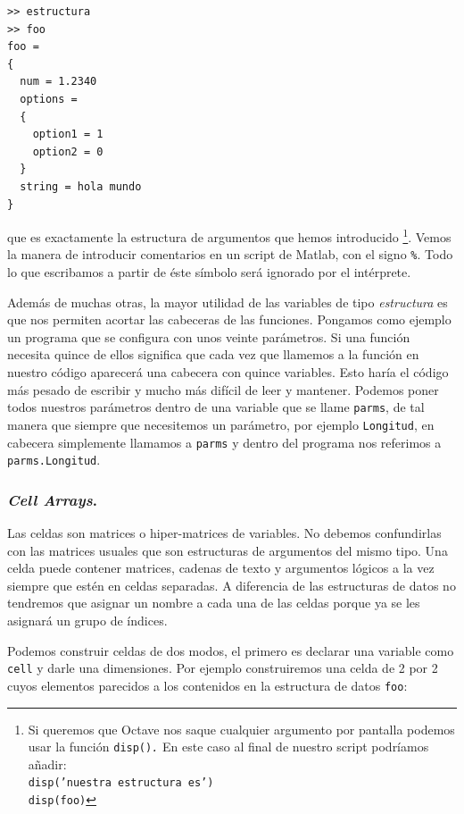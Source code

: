 \begin{lstlisting}
>> estructura
>> foo   
foo =   
{   
  num = 1.2340   
  options =   
  {   
    option1 = 1   
    option2 = 0   
  }   
  string = hola mundo   
}
\end{lstlisting}
que es exactamente la estructura de argumentos que hemos introducido
%
\footnote{Si queremos que Octave nos saque cualquier argumento por
  pantalla podemos usar la función \texttt{disp()}\texttt{\emph{.}} En
  este caso
  al final de nuestro script podríamos añadir:\\
  \texttt{disp('nuestra estructura es')}~\\
  \texttt{disp(foo)} %
}. Vemos la manera de introducir comentarios en un script de Matlab,
con el signo \texttt{\%}. Todo lo que escribamos a partir de éste
símbolo será ignorado por el intérprete.

Además de muchas otras, la mayor utilidad de las variables de tipo
\emph{estructura} es que nos permiten acortar las cabeceras de las
funciones. Pongamos como ejemplo un programa que se configura con unos
veinte parámetros. Si una función necesita quince de ellos significa
que cada vez que llamemos a la función en nuestro código aparecerá una
cabecera con quince variables. Esto haría el código más pesado de
escribir y mucho más difícil de leer y mantener. Podemos poner todos
nuestros parámetros dentro de una variable que se llame
\texttt{parms}, de tal manera que siempre que necesitemos un
parámetro, por ejemplo \texttt{Longitud}, en cabecera simplemente
llamamos a \texttt{parms} y dentro del programa nos referimos a
\texttt{parms.Longitud}.


\subsubsection{\emph{Cell Arrays}.}

Las celdas son matrices o hiper-matrices de variables.
No debemos confundirlas con las matrices usuales que son estructuras
de argumentos del mismo tipo. Una celda puede contener matrices,
cadenas de texto y argumentos lógicos a la vez siempre que estén en
celdas separadas. A diferencia de las estructuras de datos no
tendremos que asignar un nombre a cada una de las celdas porque ya se
les asignará un grupo de índices.

Podemos construir celdas de dos modos, el primero es declarar una
variable como \texttt{cell} y darle una dimensiones. Por ejemplo
construiremos una celda de 2 por 2 cuyos elementos parecidos a los
contenidos en la estructura de datos \texttt{foo}:

